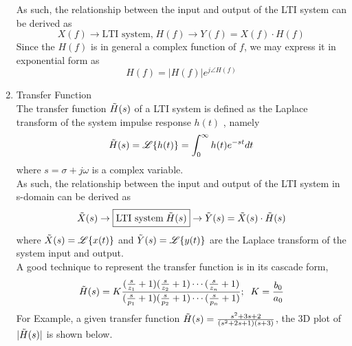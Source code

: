 \begin{enumerate}
    As such, the relationship between the input and output of the LTI system can be derived as
    \[X(f)\rightarrow\boxed{\text{LTI system,}\;H(f)}\rightarrow Y(f) = X(f)\cdot H(f)\]
    Since the $H(f)$ is in general a complex function of $f$, we may express it in exponential form as 
    \[H(f) = |H(f)|e^{j\angle H(f)}\]
    \item Transfer Function\\
    The transfer function $\Tilde{H}(s)$ of a LTI system is defined as the Laplace transform of the system impulse response $h(t)$ , namely
    \[\Tilde{H}(s) = \mathscr{L}\{h(t)\}=\int^{\infty}_0h(t)e^{-st}dt\]
    where $s = \sigma + j\omega$ is a complex variable.\\
    As such, the relationship between the input and output of the LTI system in s-domain can be derived as
    \[\Tilde{X}(s)\rightarrow\boxed{\text{LTI system}\;\Tilde{H}(s)}\rightarrow\Tilde{Y}(s)=\Tilde{X}(s)\cdot\Tilde{H}(s)\]
    where $\Tilde{X}(s) = \mathscr{L}\{x(t)\}$ and $\Tilde{Y}(s) = \mathscr{L}\{y(t)\}$ are the Laplace transform of the system input and output. \\
    A good technique to represent the transfer function is in its cascade form, 
    \[\Tilde{H}(s) = K\frac{(\frac{s}{z_1}+1)(\frac{s}{z_2} +1)\cdots(\frac{s}{z_n}+1)}{(\frac{s}{p_1}+1)(\frac{s}{p_2}+1)\cdots(\frac{s}{p_n}+1)}; \;\;K = \frac{b_0}{a_0}\]
    For Example, a given transfer function $\Tilde{H}(s) = \frac{s^2+3s+2}{(s^2+2s+1)(s+3)}$, the 3D plot of $|\Tilde{H}(s)|$ is shown below.\\
    

\end{enumerate}

